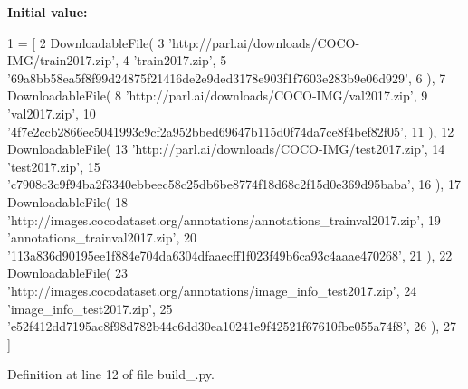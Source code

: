 {\bfseries Initial value\+:}
\begin{DoxyCode}
1 =  [
2     DownloadableFile(
3         \textcolor{stringliteral}{'http://parl.ai/downloads/COCO-IMG/train2017.zip'},
4         \textcolor{stringliteral}{'train2017.zip'},
5         \textcolor{stringliteral}{'69a8bb58ea5f8f99d24875f21416de2e9ded3178e903f1f7603e283b9e06d929'},
6     ),
7     DownloadableFile(
8         \textcolor{stringliteral}{'http://parl.ai/downloads/COCO-IMG/val2017.zip'},
9         \textcolor{stringliteral}{'val2017.zip'},
10         \textcolor{stringliteral}{'4f7e2ccb2866ec5041993c9cf2a952bbed69647b115d0f74da7ce8f4bef82f05'},
11     ),
12     DownloadableFile(
13         \textcolor{stringliteral}{'http://parl.ai/downloads/COCO-IMG/test2017.zip'},
14         \textcolor{stringliteral}{'test2017.zip'},
15         \textcolor{stringliteral}{'c7908c3c9f94ba2f3340ebbeec58c25db6be8774f18d68c2f15d0e369d95baba'},
16     ),
17     DownloadableFile(
18         \textcolor{stringliteral}{'http://images.cocodataset.org/annotations/annotations\_trainval2017.zip'},
19         \textcolor{stringliteral}{'annotations\_trainval2017.zip'},
20         \textcolor{stringliteral}{'113a836d90195ee1f884e704da6304dfaaecff1f023f49b6ca93c4aaae470268'},
21     ),
22     DownloadableFile(
23         \textcolor{stringliteral}{'http://images.cocodataset.org/annotations/image\_info\_test2017.zip'},
24         \textcolor{stringliteral}{'image\_info\_test2017.zip'},
25         \textcolor{stringliteral}{'e52f412dd7195ac8f98d782b44c6dd30ea10241e9f42521f67610fbe055a74f8'},
26     ),
27 ]
\end{DoxyCode}


Definition at line 12 of file build\+\_.\+py.

